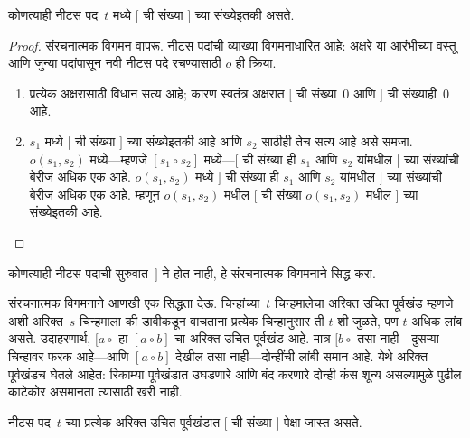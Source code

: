 \begin{prop}
कोणत्याही नीटस पद~$t$ मध्ये $[$ ची संख्या $]$ च्या संख्येइतकी असते.
\end{prop}

\begin{proof}
संरचनात्मक विगमन वापरू. नीटस पदांची व्याख्या विगमनाधारित आहे: अक्षरे या आरंभीच्या वस्तू आणि जुन्या पदांपासून नवी नीटस पदे रचण्यासाठी $o$ ही क्रिया.
\begin{enumerate}
\item प्रत्येक अक्षरासाठी विधान सत्य आहे; कारण स्वतंत्र अक्षरात $[$ ची संख्या~$0$ आणि $]$ ची संख्याही~$0$ आहे.
\item $s_1$ मध्ये $[$ ची संख्या $]$ च्या संख्येइतकी आहे आणि $s_2$ साठीही तेच सत्य आहे असे समजा. $o(s_1, s_2)$ मध्ये---म्हणजे $[s_1 \circ s_2]$ मध्ये---$[$ ची संख्या ही $s_1$ आणि $s_2$ यांमधील $[$ च्या संख्यांची बेरीज अधिक एक आहे. $o(s_1, s_2)$ मध्ये $]$ ची संख्या ही $s_1$ आणि $s_2$ यांमधील $]$ च्या संख्यांची बेरीज अधिक एक आहे. म्हणून $o(s_1, s_2)$ मधील $[$ ची संख्या $o(s_1,s_2)$ मधील $]$ च्या संख्येइतकी आहे.
\end{enumerate}
\end{proof}

\begin{prob}
कोणत्याही नीटस पदाची सुरुवात~$]$ ने होत नाही, हे संरचनात्मक विगमनाने सिद्ध करा.
\end{prob}

संरचनात्मक विगमनाने आणखी एक सिद्धता देऊ. चिन्हांच्या~$t$ चिन्हमालेचा अरिक्त उचित पूर्वखंड म्हणजे अशी अरिक्त~$s$ चिन्हमाला की डावीकडून वाचताना प्रत्येक चिन्हानुसार ती $t$ शी जुळते, पण $t$ अधिक लांब असते. उदाहरणार्थ, $[a \circ {}$ हा $[a \circ b]$ चा अरिक्त उचित पूर्वखंड आहे. मात्र $[b \circ {}$ तसा नाही---दुसऱ्या चिन्हावर फरक आहे---आणि $[a \circ b]$ देखील तसा नाही---दोन्हींची लांबी समान आहे. येथे अरिक्त पूर्वखंडच घेतले आहेत: रिकाम्या पूर्वखंडात उघडणारे आणि बंद करणारे दोन्ही कंस शून्य असल्यामुळे पुढील काटेकोर असमानता त्यासाठी खरी नाही.

\begin{prop}\label{mth:ind:sti:prop:initial}
नीटस पद~$t$ च्या प्रत्येक अरिक्त उचित पूर्वखंडात $[$ ची संख्या $]$ पेक्षा जास्त असते.
\end{prop}


